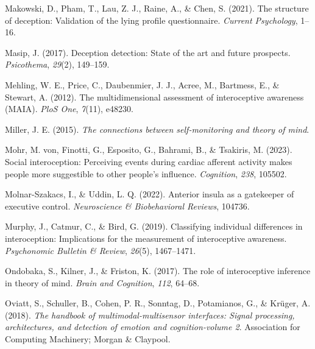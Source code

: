 \documentclass[
  man,mask,floatsintext]{apa6}
\newlength{\cslhangindent}
\newlength{\cslentryspacingunit} %
\newenvironment{CSLReferences}[2] %
 {%
  \setlength{\parindent}{0pt}
  \ifodd #1
  \let\oldpar\par
  \def\par{\hangindent=\cslhangindent\oldpar}
  \fi
  \setlength{\parskip}{#2\cslentryspacingunit}
 }%
 {}
\begin{document}
\begin{CSLReferences}{1}{0}
\leavevmode{}%
Makowski, D., Pham, T., Lau, Z. J., Raine, A., \& Chen, S. (2021). The structure of deception: Validation of the lying profile questionnaire. \emph{Current Psychology}, 1--16.

\leavevmode{}%
Masip, J. (2017). Deception detection: State of the art and future prospects. \emph{Psicothema}, \emph{29}(2), 149--159.

\leavevmode{}%
Mehling, W. E., Price, C., Daubenmier, J. J., Acree, M., Bartmess, E., \& Stewart, A. (2012). The multidimensional assessment of interoceptive awareness (MAIA). \emph{PloS One}, \emph{7}(11), e48230.

\leavevmode{}%
Miller, J. E. (2015). \emph{The connections between self-monitoring and theory of mind}.

\leavevmode{}%
Mohr, M. von, Finotti, G., Esposito, G., Bahrami, B., \& Tsakiris, M. (2023). Social interoception: Perceiving events during cardiac afferent activity makes people more suggestible to other people's influence. \emph{Cognition}, \emph{238}, 105502.

\leavevmode{}%
Molnar-Szakacs, I., \& Uddin, L. Q. (2022). Anterior insula as a gatekeeper of executive control. \emph{Neuroscience \& Biobehavioral Reviews}, 104736.

\leavevmode{}%
Murphy, J., Catmur, C., \& Bird, G. (2019). Classifying individual differences in interoception: Implications for the measurement of interoceptive awareness. \emph{Psychonomic Bulletin \& Review}, \emph{26}(5), 1467--1471.

\leavevmode{}%
Ondobaka, S., Kilner, J., \& Friston, K. (2017). The role of interoceptive inference in theory of mind. \emph{Brain and Cognition}, \emph{112}, 64--68.

\leavevmode{}%
Oviatt, S., Schuller, B., Cohen, P. R., Sonntag, D., Potamianos, G., \& Krüger, A. (2018). \emph{The handbook of multimodal-multisensor interfaces: Signal processing, architectures, and detection of emotion and cognition-volume 2}. Association for Computing Machinery; Morgan \& Claypool.


\end{CSLReferences}
\end{document}
